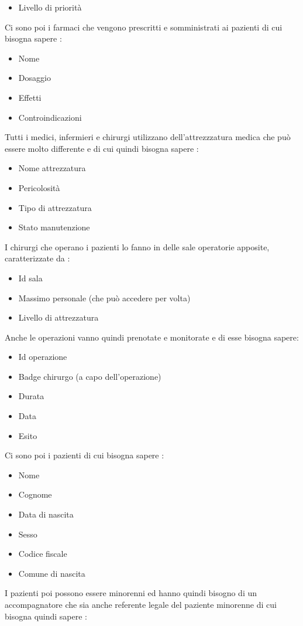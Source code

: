 \documentclass[a4paper, 10pt]{article}
\begin{document}
\begin{spacing}{0.8}
\begin{itemize}
    \item Livello di priorità
\end{itemize}
Ci sono poi i farmaci che vengono prescritti e somministrati ai pazienti di cui bisogna sapere :
\begin{itemize}
    \item Nome
    \item Dosaggio
    \item Effetti
    \item Controindicazioni
\end{itemize}
Tutti i medici, infermieri e chirurgi utilizzano dell'attrezzzatura medica che può essere molto differente e di cui quindi bisogna sapere  : 
\begin{itemize}
    \item Nome attrezzatura
    \item Pericolosità
    \item Tipo di attrezzatura
    \item Stato manutenzione
\end{itemize}
I chirurgi che operano i pazienti lo fanno in delle sale operatorie apposite, caratterizzate da  :
\begin{itemize}
    \item Id sala
    \item Massimo personale (che può accedere per volta)
    \item Livello di attrezzatura
\end{itemize}
Anche le operazioni vanno quindi prenotate e monitorate e di esse bisogna sapere:
\begin{itemize}
    \item Id operazione
    \item Badge chirurgo (a capo dell'operazione)
    \item Durata
    \item Data
    \item Esito
\end{itemize}
Ci sono poi i pazienti di cui bisogna sapere :
\begin{itemize}
    \item Nome
    \item Cognome
    \item Data di nascita
    \item Sesso
    \item Codice fiscale
    \item Comune di nascita
\end{itemize}
I pazienti poi possono essere minorenni ed hanno quindi bisogno di un accompagnatore che sia anche referente legale del paziente minorenne di cui bisogna quindi sapere :

\end{spacing}
\end{document}
